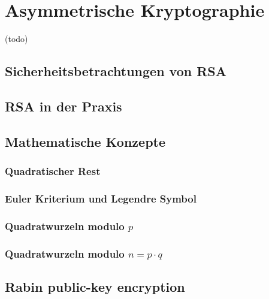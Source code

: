 \chapter{Asymmetrische Kryptographie}

(todo)

\section{Sicherheitsbetrachtungen von RSA}

\section{RSA in der Praxis}

\section{Mathematische Konzepte}

\subsection{Quadratischer Rest}

\subsection{Euler Kriterium und Legendre Symbol}

\subsection{Quadratwurzeln modulo $p$}

\subsection{Quadratwurzeln modulo $n = p \cdot q$}

\section{Rabin public-key encryption}
